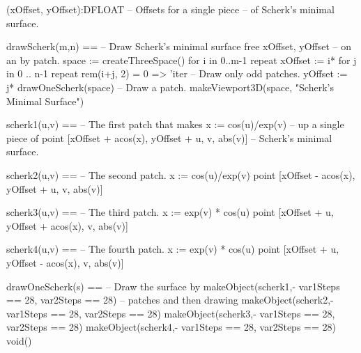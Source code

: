\begin{xmpLinesPlain}
(xOffset, yOffset):DFLOAT                                -- Offsets for a single piece
                                                         -- \quad{}of Scherk's minimal surface.

drawScherk(m,n) ==                                       -- Draw Scherk's minimal surface
  free xOffset, yOffset                                  -- \quad{}on an  by  patch.
  space := createThreeSpace()
  for i in 0..m-1 repeat
    xOffset := i*%
    for j in 0 .. n-1 repeat
      rem(i+j, 2) = 0 => 'iter                           -- Draw only odd patches.
      yOffset := j*%
      drawOneScherk(space)                               -- Draw a patch.
  makeViewport3D(space, "Scherk's Minimal Surface")

scherk1(u,v) ==                                          -- The first patch that makes
  x := cos(u)/exp(v)                                     -- \quad{}up a single piece of
  point [xOffset + acos(x), yOffset + u, v, abs(v)]      -- \quad{}Scherk's minimal surface.

scherk2(u,v) ==                                          -- The second patch.
  x := cos(u)/exp(v)
  point [xOffset - acos(x), yOffset + u, v, abs(v)]

scherk3(u,v) ==                                          -- The third patch.
  x := exp(v) * cos(u)
  point [xOffset + u, yOffset + acos(x), v, abs(v)]

scherk4(u,v) ==                                          -- The fourth patch.
  x := exp(v) * cos(u)
  point [xOffset + u, yOffset - acos(x), v, abs(v)]

drawOneScherk(s) ==                                      -- Draw the surface by
  makeObject(scherk1,-%
             var1Steps == 28, var2Steps == 28)           -- \quad{}patches and then drawing
  makeObject(scherk2,-%
             var1Steps == 28, var2Steps == 28)
  makeObject(scherk3,-%
             var1Steps == 28, var2Steps == 28)
  makeObject(scherk4,-%
             var1Steps == 28, var2Steps == 28)
  void()
\end{xmpLinesPlain}
\begin{SysCmdOutput}
\end{SysCmdOutput}
